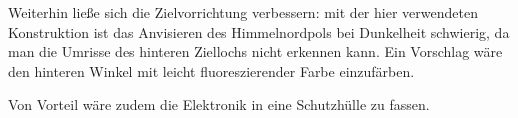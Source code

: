 Weiterhin ließe sich die Zielvorrichtung verbessern: mit der hier verwendeten Konstruktion ist das Anvisieren des Himmelnordpols bei Dunkelheit schwierig, da man die Umrisse des hinteren Ziellochs nicht erkennen kann. 
Ein Vorschlag wäre den hinteren Winkel mit leicht fluoreszierender Farbe einzufärben.

Von Vorteil wäre zudem die Elektronik in eine Schutzhülle zu fassen.


